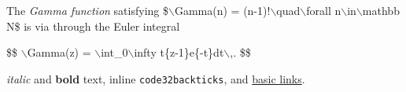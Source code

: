 \documentclass{article}
\begin{document}
The \emph{Gamma function} satisfying \$$\backslash$Gamma(n) = (n-1)!$\backslash$quad$\backslash$forall n$\backslash$in$\backslash$mathbb N\$ is via through the Euler integral

\$\$ $\backslash$Gamma(z) = $\backslash$int\_0{\tt {}}$\backslash$infty t{\tt {}}\{z-1\}e{\tt {}}\{-t\}dt$\backslash$,. \$\$

\emph{italic} and \textbf{bold} text, inline {\colorbox[rgb]{1.00,0.93,1.00}{\tt code\char32backticks}}, and \href{http://example.com}{basic links}.
\end{document}
